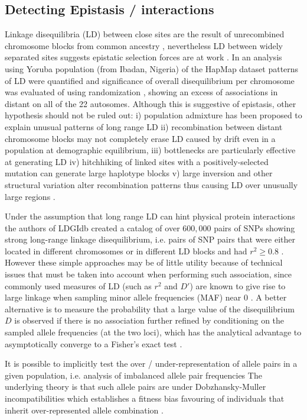 \subsection{Detecting Epistasis / interactions}

Linkage disequilibria (LD) between close sites are the result of unrecombined chromosome blocks from common ancestry \cite{REF}, nevertheless LD between widely separated sites suggests epistatic selection forces are at work \cite{REF-FISHER, REF-NATURE, koch2013long}.
In an analysis using Yoruba population (from Ibadan, Nigeria) of the HapMap dataset patterns of LD were quantified and significance of overall disequilibrium per chromosome was evaluated of using randomization \cite{koch2013long}, showing an excess of associations in distant on all of the 22 autosomes. 
Although this is suggestive of epistasis, other hypothesis should not be ruled out:
i) population admixture has been proposed to explain unusual patterns of long range LD \cite{koch2013long:REF}
ii) recombination between distant chromosome blocks may not completely erase LD caused by drift even in a population at demographic equilibrium, 
iii) bottlenecks are particularly effective at generating LD
iv) hitchhiking of linked sites with a positively-selected mutation can generate large haplotype blocks 
v) large inversion and other structural variation alter recombination patterns thus causing LD over unusually large regions \cite{koch2013long:REF}.

Under the assumption that long range LD can hint physical protein interactions the authors of LDGIdb \cite{wang2012ldgidb} created a catalog of over $600,000$ pairs of SNPs showing strong long-range linkage disequilibrium, i.e. pairs of SNP pairs that were either located in different chromosomes or in different LD blocks and had $r^2 \ge 0.8$ \cite{wang2012ldgidb}.
However these simple approaches may be of little utility because of technical issues that must be taken into account when performing such association, since commonly used measures of LD (such as $r^2$ and $D'$) are known to give rise to large linkage when sampling minor allele frequencies (MAF) near 0 \cite{koch2013long}.
A better alternative is to measure the probability that a large value of the disequilibrium $D$ is observed if there is no association further refined by conditioning on the sampled allele frequencies (at the two loci), which has the analytical advantage to asymptotically converge to a Fisher's exact test \cite{koch2013long}.

It is possible to implicitly test the over / under-representation of allele pairs in a given population, i.e. analysis of imbalanced allele pair frequencies \cite{ackermann2012systematic}
The underlying theory is that such allele pairs are under Dobzhansky-Muller incompatibilities which establishes a fitness bias favouring of individuals that inherit over-represented allele combination \cite{ackermann2012systematic}.

